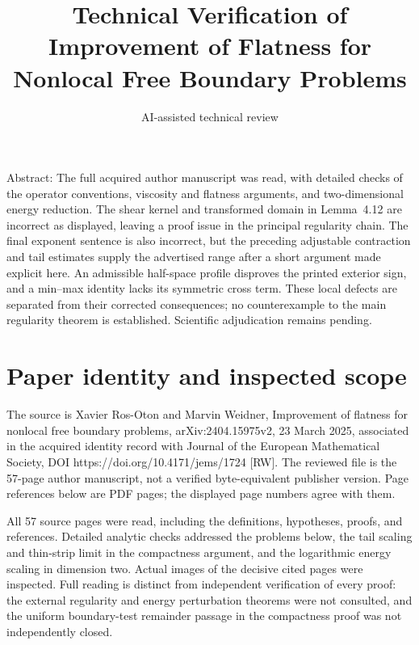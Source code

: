 \documentclass[10pt]{article}
\title{Technical Verification of
Improvement of Flatness for Nonlocal Free Boundary Problems}
\author{AI-assisted technical review}
\date{}
\begin{document}
\maketitle
Abstract: The full acquired author manuscript was read, with detailed checks of the operator conventions, viscosity and flatness arguments, and two-dimensional energy reduction. The shear kernel and transformed domain in Lemma 4.12 are incorrect as displayed, leaving a proof issue in the principal regularity chain. The final exponent sentence is also incorrect, but the preceding adjustable contraction and tail estimates supply the advertised range after a short argument made explicit here. An admissible half-space profile disproves the printed exterior sign, and a min–max identity lacks its symmetric cross term. These local defects are separated from their corrected consequences; no counterexample to the main regularity theorem is established. Scientific adjudication remains pending.\par
\section*{Paper identity and inspected scope}
The source is Xavier Ros-Oton and Marvin Weidner, Improvement of flatness for nonlocal free boundary problems, arXiv:2404.15975v2, 23 March 2025, associated in the acquired identity record with Journal of the European Mathematical Society, DOI https://doi.org/10.4171/jems/1724 [RW]. The reviewed file is the 57-page author manuscript, not a verified byte-equivalent publisher version. Page references below are PDF pages; the displayed page numbers agree with them.\par
All 57 source pages were read, including the definitions, hypotheses, proofs, and references. Detailed analytic checks addressed the problems below, the tail scaling and thin-strip limit in the compactness argument, and the logarithmic energy scaling in dimension two. Actual images of the decisive cited pages were inspected. Full reading is distinct from independent verification of every proof: the external regularity and energy perturbation theorems were not consulted, and the uniform boundary-test remainder passage in the compactness proof was not independently closed.\par
\end{document}
